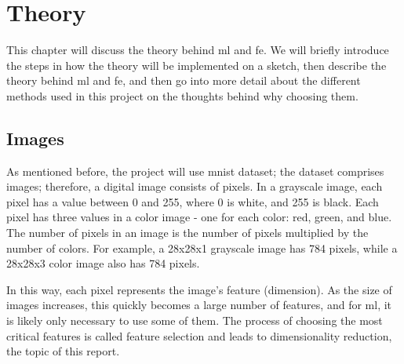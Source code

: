 \chapter{Theory}\label{cha:theory}
This chapter will discuss the theory behind \gls{ml} and \gls{fe}. We will briefly introduce the steps in how the theory will be implemented on a sketch, then describe the theory behind \gls{ml} and \gls{fe}, and then go into more detail about the different methods used in this project on the thoughts behind why choosing them.

\section{Images}\label{sec:images}
As mentioned before, the project will use \gls{mnist} dataset; the dataset comprises images; therefore, a digital image consists of pixels. In a grayscale image, each pixel has a value between 0 and 255, where 0 is white, and 255 is black. Each pixel has three values in a color image - one for each color: red, green, and blue. The number of pixels in an image is the number of pixels multiplied by the number of colors. For example, a 28x28x1 grayscale image has 784 pixels, while a 28x28x3 color image also has 784 pixels.

In this way, each pixel represents the image's feature (dimension). As the size of images increases, this quickly becomes a large number of features, and for \gls{ml}, it is likely only necessary to use some of them. The process of choosing the most critical features is called feature selection and leads to dimensionality reduction, the topic of this report.



